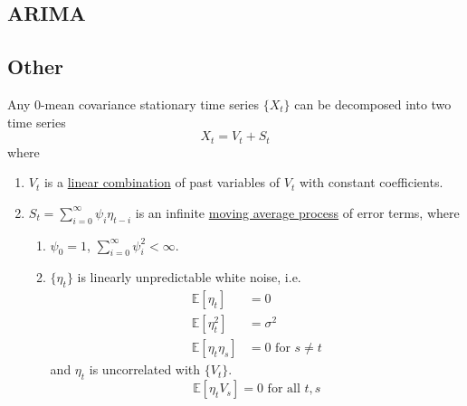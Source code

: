 \documentclass{article}
\begin{document}
\subsection{ARIMA}

\subsection{Other}

  \begin{theorem}
    \label{thm:wold-representation-theorem}
    Any $0$-mean covariance stationary time series $\{X_t\}$ can be decomposed into two time series 
    \begin{equation}
      X_t = V_t + S_t
    \end{equation}
    where 
    \begin{enumerate}
      \item $V_t$ is a \hyperref[lin-def:linear-combination]{linear combination} of past variables of $V_t$ with constant coefficients. 
      \item $S_t = \sum_{i=0}^\infty \psi_i \eta_{t-i}$ is an infinite \hyperref[def:moving-average-process]{moving average process} of error terms, where 
        \begin{enumerate}
          \item $\psi_0 = 1$, $\sum_{i=0}^\infty \psi_i^2 < \infty$. 
          \item $\{\eta_t\}$ is linearly unpredictable white noise, i.e. 
            \begin{align}
              \mathbb{E}[\eta_t] & = 0 \\
              \mathbb{E}[\eta_t^2] & = \sigma^2 \\
              \mathbb{E}[\eta_t \eta_s] & = 0 \text{ for } s \neq t 
            \end{align}
            and $\eta_t$ is uncorrelated with $\{V_t\}$.  
            \begin{equation}
              \mathbb{E}[\eta_t V_s] = 0 \text{ for all } t, s
            \end{equation}
        \end{enumerate}
    \end{enumerate}
  \end{theorem}
\end{document}
